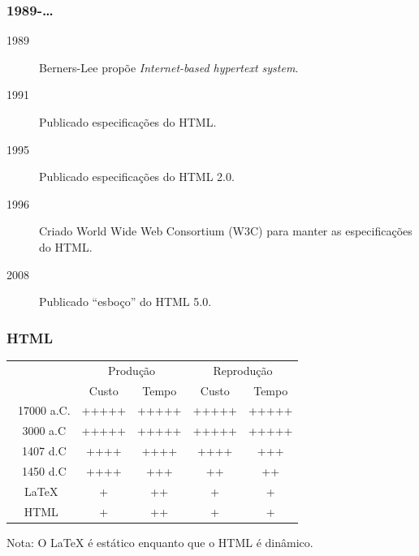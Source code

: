 \documentclass[]{beamer}
\begin{document}
\begin{frame}
    \frametitle{1989-\ldots}
    \begin{description}
        \item[1989] Berners-Lee prop\~{o}e \textit{Internet-based hypertext system}.
        \item[1991] Publicado especifica\c{c}\~{o}es do HTML.
        \item[1995] Publicado especifica\c{c}\~{o}es do HTML 2.0.
        \item[1996] Criado World Wide Web Consortium (W3C) para manter as especifica\c{c}\~{o}es do HTML.
        \item[2008] Publicado ``esbo\c{c}o'' do HTML 5.0.
    \end{description}
\end{frame}

\begin{frame}[fragile]
    \frametitle{HTML}
    
\end{frame}

\begin{frame}[t]
    \begin{center}
        \begin{tabular}{|c|c|c|c|c|}
            \hline
            & \multicolumn{2}{|c|}{Produ\c{c}\~{a}o} & \multicolumn{2}{|c|}{Reprodu\c{c}\~{a}o} \\ \cline{2-5}
            & Custo & Tempo & Custo & Tempo \\ \hline
            ~17000 a.C. & +++++ & +++++ & +++++ & +++++  \\ \hline
            ~3000 a.C & +++++ & +++++ & +++++ & +++++ \\ \hline
            ~1407 d.C & ++++ & ++++ & ++++ & +++ \\ \hline
            ~1450 d.C & ++++ & +++ & ++ & ++ \\ \hline
            LaTeX  & + & ++ & + & + \\ \hline
            HTML & + & ++ & + & + \\ \hline
        \end{tabular}
    \end{center}
    \pause
    Nota: O LaTeX \'{e} est\'{a}tico enquanto que o HTML \'{e} din\^{a}mico.
\end{frame}
\end{document}
